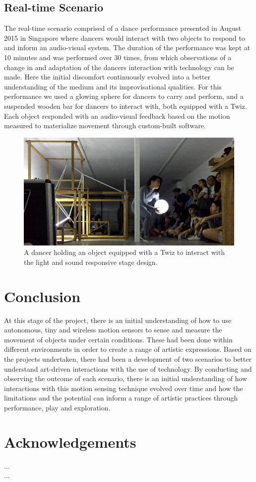 \documentclass{sigchi}
\begin{document}
\subsection{Real-time Scenario}
The real-time scenario comprised of a dance
performance presented in August 2015 in Singapore
where dancers would interact with two objects to
respond to and inform an audio-visual system. The
duration of the performance was kept at 10 minutes
and was performed over 30 times, from which
observations of a change in and adaptation of the
dancers interaction with technology can be made. Here
the initial discomfort continuously evolved into a better
understanding of the medium and its improvisational
qualities. For this performance we used a glowing
sphere for dancers to carry and perform, and a
suspended wooden bar for dancers to interact with,
both equipped with a Twiz. Each object responded with
an audio-visual feedback based on the motion
measured to materialize movement \cite{hansen} through
custom-built software.

\begin{figure}[H]
\centering
\includegraphics[width=\columnwidth]{pics/performance}
\caption{A dancer holding an object equipped with a Twiz to
interact with the light and sound responsive stage design.}
\label{fig:performance}
\end{figure}

\section{Conclusion}

At this stage of the project, there is an initial
understanding of how to use autonomous, tiny and
wireless motion sensors to sense and measure the
movement of objects under certain conditions. These
had been done within different environments in order to
create a range of artistic expressions. Based on the
projects undertaken, there had been a development of
two scenarios to better understand art-driven
interactions with the use of technology.
By conducting and observing the outcome of each
scenario, there is an initial understanding of how
interactions with this motion sensing technique evolved
over time and how the limitations and the potential can
inform a range of artistic practices through
performance, play and exploration.

\section{Acknowledgements}

...\\
...

\balance



\end{document}
